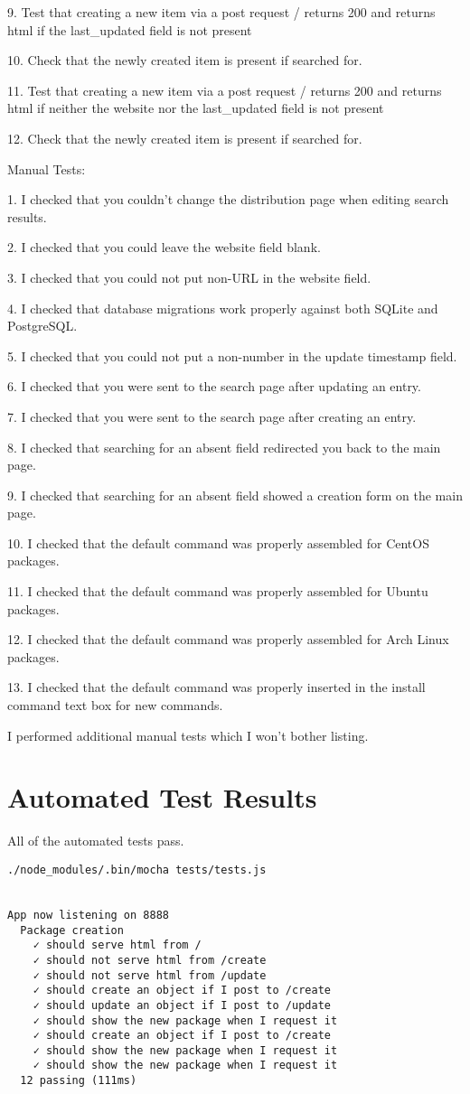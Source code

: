 \documentclass[12pt]{article}
\begin{document}
9. Test that creating a new item via a post request / returns 200 and returns html if the last\_updated field is not present

10. Check that the newly created item is present if searched for.

11. Test that creating a new item via a post request / returns 200 and returns html if neither the website nor the last\_updated field is not present

12. Check that the newly created item is present if searched for.

Manual Tests:

1. I checked that you couldn't change the distribution page when editing search results.

2. I checked that you could leave the website field blank.

3. I checked that you could not put non-URL in the website field.

4. I checked that database migrations work properly against both SQLite and PostgreSQL.

5. I checked that you could not put a non-number in the update timestamp field.

6. I checked that you were sent to the search page after updating an entry.

7. I checked that you were sent to the search page after creating an entry.

8. I checked that searching for an absent field redirected you back to the main page.

9. I checked that searching for an absent field showed a creation form on the main page.

10. I checked that the default command was properly assembled for CentOS packages.

11. I checked that the default command was properly assembled for Ubuntu packages.

12. I checked that the default command was properly assembled for Arch Linux packages.

13. I checked that the default command was properly inserted in the install command text box for new commands.

I performed additional manual tests which I won't bother listing.

\section{Automated Test Results}
All of the automated tests pass.
\begin{verbatim}
./node_modules/.bin/mocha tests/tests.js 


App now listening on 8888
  Package creation
    ✓ should serve html from /
    ✓ should not serve html from /create
    ✓ should not serve html from /update
    ✓ should create an object if I post to /create
    ✓ should update an object if I post to /update
    ✓ should show the new package when I request it
    ✓ should create an object if I post to /create
    ✓ should show the new package when I request it
    ✓ should show the new package when I request it
  12 passing (111ms)


\end{verbatim}
\end{document}
